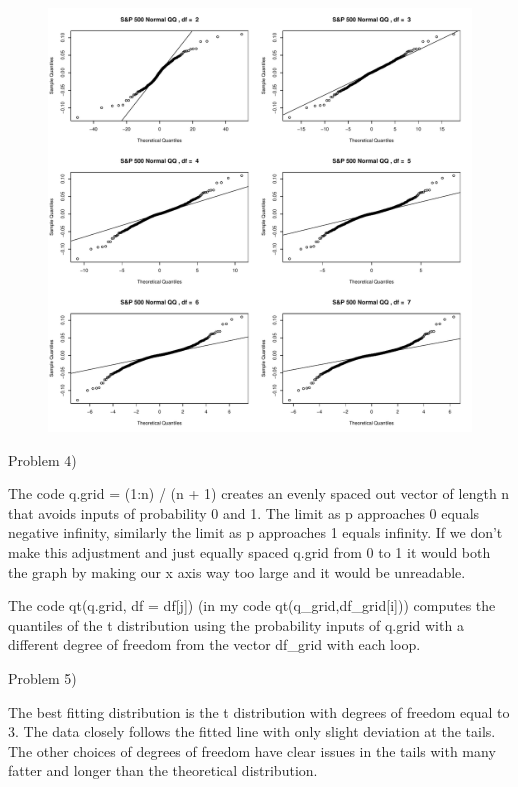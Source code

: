 \documentclass[
  letterpaper,
  DIV=11,
  numbers=noendperiod]{scrartcl}
\begin{document}
\begin{figure}[H]

{\centering \includegraphics{homework_1_files/figure-pdf/unnamed-chunk-18-1.pdf}

}

\end{figure}

Problem 4)

The code q.grid = (1:n) / (n + 1) creates an evenly spaced out vector of
length n that avoids inputs of probability 0 and 1. The limit as p
approaches 0 equals negative infinity, similarly the limit as p
approaches 1 equals infinity. If we don't make this adjustment and just
equally spaced q.grid from 0 to 1 it would both the graph by making our
x axis way too large and it would be unreadable.

The code qt(q.grid, df = df{[}j{]}) (in my code
qt(q\_grid,df\_grid{[}i{]})) computes the quantiles of the t
distribution using the probability inputs of q.grid with a different
degree of freedom from the vector df\_grid with each loop.

Problem 5)

The best fitting distribution is the t distribution with degrees of
freedom equal to 3. The data closely follows the fitted line with only
slight deviation at the tails. The other choices of degrees of freedom
have clear issues in the tails with many fatter and longer than the
theoretical distribution.
\end{document}
